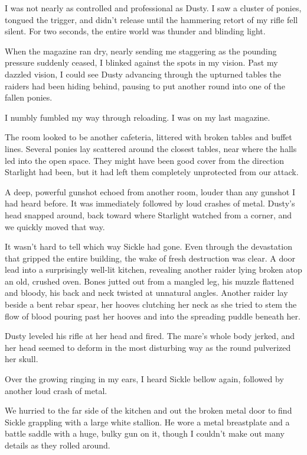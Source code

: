 I was not nearly as controlled and professional as Dusty. I saw a cluster of ponies, tongued the trigger, and didn’t release until the hammering retort of my rifle fell silent. For two seconds, the entire world was thunder and blinding light.

When the magazine ran dry, nearly sending me staggering as the pounding pressure suddenly ceased, I blinked against the spots in my vision. Past my dazzled vision, I could see Dusty advancing through the upturned tables the raiders had been hiding behind, pausing to put another round into one of the fallen ponies.

I numbly fumbled my way through reloading. I was on my last magazine.

The room looked to be another cafeteria, littered with broken tables and buffet lines. Several ponies lay scattered around the closest tables, near where the halls led into the open space. They might have been good cover from the direction Starlight had been, but it had left them completely unprotected from our attack.

A deep, powerful gunshot echoed from another room, louder than any gunshot I had heard before. It was immediately followed by loud crashes of metal. Dusty’s head snapped around, back toward where Starlight watched from a corner, and we quickly moved that way.

It wasn’t hard to tell which way Sickle had gone. Even through the devastation that gripped the entire building, the wake of fresh destruction was clear. A door lead into a surprisingly well-lit kitchen, revealing another raider lying broken atop an old, crushed oven. Bones jutted out from a mangled leg, his muzzle flattened and bloody, his back and neck twisted at unnatural angles. Another raider lay beside a bent rebar spear, her hooves clutching her neck as she tried to stem the flow of blood pouring past her hooves and into the spreading puddle beneath her.

Dusty leveled his rifle at her head and fired. The mare’s whole body jerked, and her head seemed to deform in the most disturbing way as the round pulverized her skull.

Over the growing ringing in my ears, I heard Sickle bellow again, followed by another loud crash of metal.

We hurried to the far side of the kitchen and out the broken metal door to find Sickle grappling with a large white stallion. He wore a metal breastplate and a battle saddle with a huge, bulky gun on it, though I couldn’t make out many details as they rolled around.

